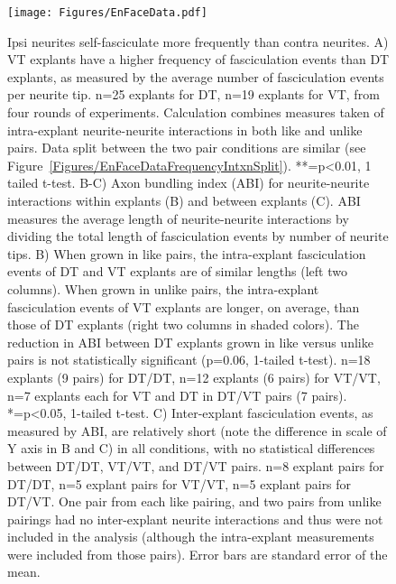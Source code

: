 \begin{figure}[hbtp]
    \begin{center}
        \texttt{[image: Figures/EnFaceData.pdf]}
        \caption[Ipsi neurites self-fasciculate more frequently than contra neurites.]
        {Ipsi neurites self-fasciculate more frequently than contra neurites.
        A) VT explants have a higher frequency of fasciculation events than DT explants, as measured by the average number of fasciculation events per neurite tip.
        n=25 explants for DT, n=19 explants for VT, from four rounds of experiments.
        Calculation combines measures taken of intra-explant neurite-neurite interactions in both like and unlike pairs.
        Data split between the two pair conditions are similar (see Figure~\ref{Figures/EnFaceDataFrequencyIntxnSplit}).
        **=p<0.01, 1 tailed t-test.
        B-C) Axon bundling index (ABI) for neurite-neurite interactions within explants (B) and between explants (C).
        ABI measures the average length of neurite-neurite interactions by dividing the total length of fasciculation events by number of neurite tips.
        B) When grown in like pairs, the intra-explant fasciculation events of DT and VT explants are of similar lengths (left two columns).
        When grown in unlike pairs, the intra-explant fasciculation events of VT explants are longer, on average, than those of DT explants (right two columns in shaded colors).
        The reduction in ABI between DT explants grown in like versus unlike pairs is not statistically significant (p=0.06, 1-tailed t-test).
        n=18 explants (9 pairs) for DT/DT, n=12 explants (6 pairs) for VT/VT, n=7 explants each for VT and DT in DT/VT pairs (7 pairs).
        *=p<0.05, 1-tailed t-test.
        C) Inter-explant fasciculation events, as measured by ABI, are relatively short (note the difference in scale of Y axis in B and C) in all conditions, with no statistical differences between DT/DT, VT/VT, and DT/VT pairs.
        n=8 explant pairs for DT/DT, n=5 explant pairs for VT/VT, n=5 explant pairs for DT/VT.
        One pair from each like pairing, and two pairs from unlike pairings had no inter-explant neurite interactions and thus were not included in the analysis (although the intra-explant measurements were included from those pairs).
        Error bars are standard error of the mean.
        }
        \label{Figures/EnFaceData}
    \end{center}
\end{figure}

